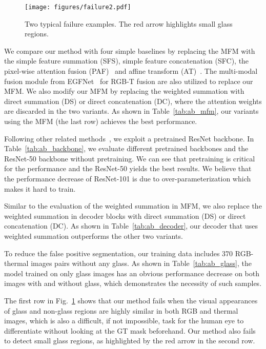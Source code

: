 \begin{figure}[t]
\centering
\texttt{[image: figures/failure2.pdf]}
\caption{Two typical failure examples. The red arrow highlights small glass regions.}
\label{fig:fail}
\end{figure}

 We compare our method with four simple baselines by replacing the MFM with the simple feature summation (SFS), simple feature concatenation (SFC), the pixel-wise attention fusion (PAF)~\cite{kalra2020deep} and affine transform (AT)~\cite{li2020rgb}. The multi-modal fusion module from EGFNet~\cite{zhou2022edge} for RGB-T fusion are also utilized to replace our MFM. We also modify our MFM by replacing the weighted summation with direct summation (DS) or direct concatenation (DC), where the attention weights are discarded in the two variants. As shown in Table~\ref{tab:ab_mfm}, our variants using the MFM (the last row) achieves the best performance. 

 Following other related methods~\cite{chen2020dpanet, li2021hierarchical, zhang2020select, zhang2020uc, ji2020accurate}, we exploit a pretrained ResNet backbone. In Table~\ref{tab:ab_backbone}, we evaluate different pretrained backbones and the ResNet-50 backbone without pretraining. We can see that  pretraining is critical for the performance and the ResNet-50 yields the best results. We believe that the performance decrease of ResNet-101 is due to  over-parameterization which makes it hard to train.

 Similar to the evaluation of the weighted summation in MFM, we also replace the weighted summation in decoder blocks with direct summation (DS) or direct concatenation (DC). As shown in Table~\ref{tab:ab_decoder}, our decoder that uses weighted summation outperforms the other two variants.



 To reduce the false positive segmentation, our training data includes 370 RGB-thermal images pairs without any glass. As shown in Table~\ref{tab:ab_glass}, the model trained on only glass images has an obvious performance decrease on both images with and without glass, which demonstrates the necessity of such samples.




 The first row in Fig.~\ref{fig:fail} shows that our method fails when the visual appearances of glass and non-glass regions are highly similar in both RGB and thermal images, which is also a difficult, if not impossible, task for the human eye to differentiate without looking at the GT mask beforehand. Our method also fails to detect small glass regions, as highlighted by the red arrow in the second row.







